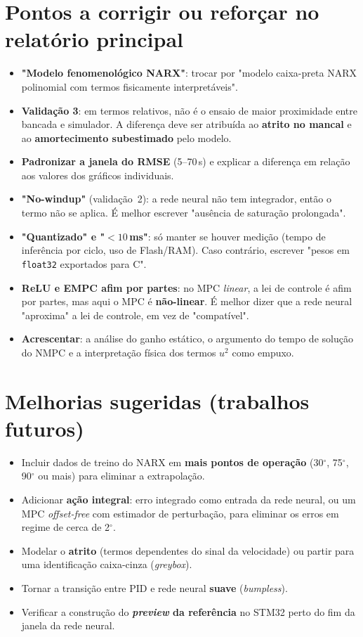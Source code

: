 \documentclass[12pt,a4paper]{article}
\newcommand{\graus}{$^\circ$}
\begin{document}
\section{Pontos a corrigir ou reforçar no relatório principal}
\begin{itemize}
    \item \textbf{"Modelo fenomenológico NARX"}: trocar por "modelo caixa-preta NARX polinomial com termos fisicamente interpretáveis".
    \item \textbf{Validação 3}: em termos relativos, não é o ensaio de maior proximidade entre bancada e simulador. A diferença deve ser atribuída ao \textbf{atrito no mancal} e ao \textbf{amortecimento subestimado} pelo modelo.
    \item \textbf{Padronizar a janela do RMSE} (5--70\,s) e explicar a diferença em relação aos valores dos gráficos individuais.
    \item \textbf{"No-windup"} (validação~2): a rede neural não tem integrador, então o termo não se aplica. É melhor escrever "ausência de saturação prolongada".
    \item \textbf{"Quantizado" e "$<10$\,ms"}: só manter se houver medição (tempo de inferência por ciclo, uso de Flash/RAM). Caso contrário, escrever "pesos em \texttt{float32} exportados para C".
    \item \textbf{ReLU e EMPC afim por partes}: no MPC \textit{linear}, a lei de controle é afim por partes, mas aqui o MPC é \textbf{não-linear}. É melhor dizer que a rede neural "aproxima" a lei de controle, em vez de "compatível".
    \item \textbf{Acrescentar}: a análise do ganho estático, o argumento do tempo de solução do NMPC e a interpretação física dos termos $u^2$ como empuxo.
\end{itemize}

\section{Melhorias sugeridas (trabalhos futuros)}
\begin{itemize}
    \item Incluir dados de treino do NARX em \textbf{mais pontos de operação} (30\graus{}, 75\graus{}, 90\graus{} ou mais) para eliminar a extrapolação.
    \item Adicionar \textbf{ação integral}: erro integrado como entrada da rede neural, ou um MPC \textit{offset-free} com estimador de perturbação, para eliminar os erros em regime de cerca de 2\graus{}.
    \item Modelar o \textbf{atrito} (termos dependentes do sinal da velocidade) ou partir para uma identificação caixa-cinza (\textit{greybox}).
    \item Tornar a transição entre PID e rede neural \textbf{suave} (\textit{bumpless}).
    \item Verificar a construção do \textbf{\textit{preview} da referência} no STM32 perto do fim da janela da rede neural.
\end{itemize}
\end{document}
